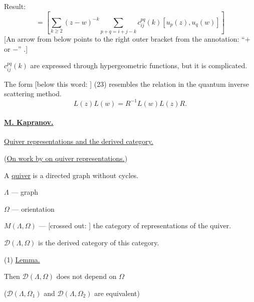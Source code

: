 Result:
\begin{equation*}
[u_i(z),u_j(w)]=
\left[\sum_{k\geq2}(z-w)^{-k}
\sum_{p+q=i+j-k}c_{ij}^{pq}(k)[u_p(z),u_q(w)]\right] \tag{24}
\end{equation*}
[An arrow from below points to the right outer bracket from the annotation:
``$+$ or $-$'' .]

$c_{ij}^{pq}(k)$ are expressed through hypergeometric functions, but it is complicated.

The form [below this word: ]
(23) resembles the relation in the quantum inverse scattering method.
\begin{equation*}
L(z)L(w)=R^{-1}L(w)L(z)R. \tag{25}
\end{equation*}

\paragraph*{\underline{\underline{M. Kapranov.}}}
\underline{Quiver representations and the derived category.}

(\underline{On work by 
on quiver representations.})

A \underline{quiver} is a directed graph without cycles.

\begin{center}
\end{center}
$\Lambda$ --- graph

$\Omega$ --- orientation

$M(\Lambda,\Omega)$ ---
[crossed out: ]
the category of representations of the quiver.

$\mathcal D(\Lambda,\Omega)$ is the derived category of this category.

(1) \underline{Lemma.}

Then $\mathcal D(\Lambda,\Omega)$ does not depend on $\Omega$

($\mathcal D(\Lambda,\Omega_1)$ and $\mathcal D(\Lambda,\Omega_2)$ are equivalent)

